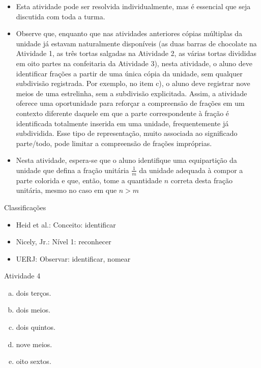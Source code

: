 \begin{multicols}{2}
  \begin{itemize} %
    \item       Esta atividade pode ser resolvida individualmente, mas é essencial que seja discutida com toda a turma.
    \item       Observe que, enquanto que nas atividades anteriores cópias múltiplas da unidade já estavam naturalmente disponíveis (as duas barras de chocolate na Atividade 1, as três tortas salgadas na Atividade 2, as várias tortas divididas em oito partes na confeitaria da Atividade 3), nesta atividade, o aluno deve identificar frações a partir de uma única cópia da unidade, sem qualquer subdivisão registrada. Por exemplo, no item c), o aluno deve registrar nove meios de uma estrelinha, sem a subdivisão explicitada. Assim, a atividade oferece uma oportunidade para reforçar a compreensão de frações em um contexto diferente daquele em que a parte correspondente à fração é identificada totalmente inserida em uma unidade, frequentemente já subdividida. Esse tipo de representação, muito associada ao significado parte/todo, pode limitar a compreensão de frações impróprias.
    \item       Nesta atividade, espera-se que o aluno identifique uma equipartição da unidade que defina a fração unitária       $\frac{1}{m}$       da unidade adequada à compor a parte colorida e que, então, tome a quantidade       $n$       correta desta fração unitária, mesmo no caso em que       $n > m$
\end{itemize} %


  Classificações
\begin{itemize} %
    \item       Heid et al.: Conceito: identificar
    \item       Nicely, Jr.: Nível 1: reconhecer
    \item       UERJ: Observar: identificar, nomear
\end{itemize} %

\begin{resposta*}{Atividade 4}
  \begin{enumerate}[a)]
   \item dois terços.
   \item dois meios.
   \item dois quintos.
   \item nove meios.
   \item oito sextos.
\end{enumerate}
  \end{resposta*}


\end{multicols}

